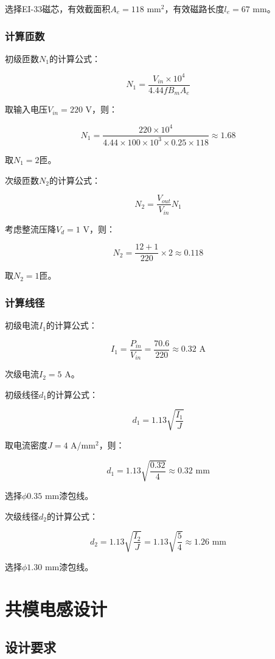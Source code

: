\documentclass[12pt,UTF8]{ctexbook}
\begin{document}
选择EI-33磁芯，有效截面积$A_e = 118$ mm$^2$，有效磁路长度$l_e = 67$ mm。

\subsubsection{计算匝数}

初级匝数$N_1$的计算公式：

$$ N_1 = \frac{V_{in} \times 10^4}{4.44 f B_m A_e} $$

取输入电压$V_{in} = 220$ V，则：

$$ N_1 = \frac{220 \times 10^4}{4.44 \times 100 \times 10^3 \times 0.25 \times 118} \approx 1.68 $$

取$N_1 = 2$匝。

次级匝数$N_2$的计算公式：

$$ N_2 = \frac{V_{out}}{V_{in}} N_1 $$

考虑整流压降$V_d = 1$ V，则：

$$ N_2 = \frac{12 + 1}{220} \times 2 \approx 0.118 $$

取$N_2 = 1$匝。

\subsubsection{计算线径}

初级电流$I_1$的计算公式：

$$ I_1 = \frac{P_{in}}{V_{in}} = \frac{70.6}{220} \approx 0.32 \text{ A} $$

次级电流$I_2 = 5$ A。

初级线径$d_1$的计算公式：

$$ d_1 = 1.13 \sqrt{\frac{I_1}{J}} $$

取电流密度$J = 4$ A/mm$^2$，则：

$$ d_1 = 1.13 \sqrt{\frac{0.32}{4}} \approx 0.32 \text{ mm} $$

选择$\phi 0.35$ mm漆包线。

次级线径$d_2$的计算公式：

$$ d_2 = 1.13 \sqrt{\frac{I_2}{J}} = 1.13 \sqrt{\frac{5}{4}} \approx 1.26 \text{ mm} $$

选择$\phi 1.30$ mm漆包线。

\section{共模电感设计}

\subsection{设计要求}
\end{document}
